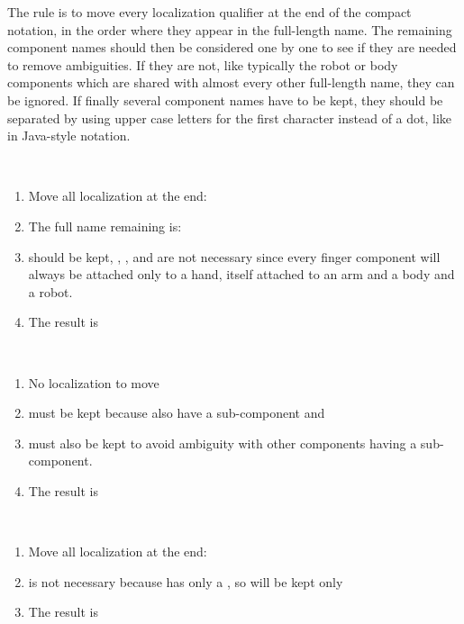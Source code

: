 The rule is to move every localization qualifier at the end of the
compact notation, in the order where they appear in the full-length
name. The remaining component names should then be considered one by
one to see if they are needed to remove ambiguities. If they are not,
like typically the robot or body components which are shared with
almost every other full-length name, they can be ignored. If finally
several component names have to be kept, they should be separated by
using upper case letters for the first character instead of a dot, like
in Java-style notation.

\begin{example}~\\
  \begin{enumerate}
  \item Move all localization at the end:
  \item The full name remaining is: 
  \item {} should be kept, , ,
     and  are not necessary since every
    finger component will always be attached only to a hand, itself
    attached to an arm and a body and a robot.
  \item The result is 
  \end{enumerate}
\end{example}


\begin{example}~\\
  \begin{enumerate}
  \item No localization to move
  \item {} must be kept because  also have a
     sub-component and
  \item {} must also be kept to avoid ambiguity with other
    components having a  sub-component.
  \item The result is 
  \end{enumerate}
\end{example}

\begin{example}~\\
  \begin{enumerate}
  \item Move all localization at the end:
  \item {} is not necessary because  has only a
    , so  will be kept only
  \item The result is 
  \end{enumerate}
\end{example}

